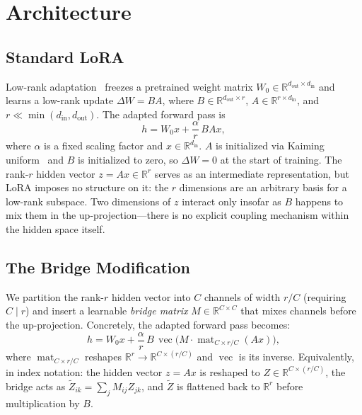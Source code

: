 
\section{Architecture}
\label{sec:architecture}

\subsection{Standard LoRA}
\label{sec:standard-lora}

Low-rank adaptation~\cite{hu2022lora} freezes a pretrained weight matrix
$W_0 \in \mathbb{R}^{d_\text{out} \times d_\text{in}}$ and learns a
low-rank update $\Delta W = BA$, where $B \in \mathbb{R}^{d_\text{out}
\times r}$, $A \in \mathbb{R}^{r \times d_\text{in}}$, and $r \ll
\min(d_\text{in}, d_\text{out})$.
The adapted forward pass is
\begin{equation}
  h = W_0 x + \frac{\alpha}{r}\, B A x,
  \label{eq:lora}
\end{equation}
where $\alpha$ is a fixed scaling factor and $x \in \mathbb{R}^{d_\text{in}}$.
$A$ is initialized via Kaiming uniform~\cite{he2015delving} and $B$ is
initialized to zero, so $\Delta W = 0$ at the start of training.
The rank-$r$ hidden vector $z = Ax \in \mathbb{R}^r$ serves as an
intermediate representation, but LoRA imposes no structure on it:
the $r$ dimensions are an arbitrary basis for a low-rank subspace.
Two dimensions of $z$ interact only insofar as $B$ happens to mix
them in the up-projection---there is no explicit coupling mechanism
within the hidden space itself.

\subsection{The Bridge Modification}
\label{sec:bridge}

We partition the rank-$r$ hidden vector into $C$ channels of width
$r / C$ (requiring $C \mid r$) and insert a learnable \emph{bridge
matrix} $M \in \mathbb{R}^{C \times C}$ that mixes channels before
the up-projection.
Concretely, the adapted forward pass becomes:
\begin{equation}
  h = W_0 x + \frac{\alpha}{r}\, B\,
    \operatorname{vec}\!\bigl(M \cdot
    \operatorname{mat}_{C \times r/C}(Ax)\bigr),
  \label{eq:bridge}
\end{equation}
where $\operatorname{mat}_{C \times r/C}$ reshapes $\mathbb{R}^r
\to \mathbb{R}^{C \times (r/C)}$ and $\operatorname{vec}$ is its
inverse.
Equivalently, in index notation: the hidden vector $z = Ax$ is
reshaped to $Z \in \mathbb{R}^{C \times (r/C)}$, the bridge acts as
$\tilde{Z}_{ik} = \sum_j M_{ij} Z_{jk}$, and $\tilde{Z}$ is
flattened back to $\mathbb{R}^r$ before multiplication by $B$.

